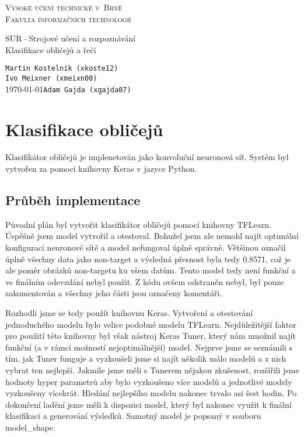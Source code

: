 \documentclass[a4paper,11pt]{article}
\begin{document}
	\begin{titlepage}
		\begin{center}
			\textsc{\Huge Vysoké učení technické v~Brně\\
				\vspace{0.4em}\huge Fakulta informačních technologií}
			
			
			{\LARGE SUR\,--\,Strojové učení a rozpoznávání\\
				\Huge Klasifikace obličejů a řeči\\ \vspace{0.3em}}
			
			
			{\Large \hfill \texttt{Martin Kostelník (xkoste12)}}\\
			{\Large \hfill \texttt{Ivo Meixner (xmeixn00)}}\\
			{\Large \today \hfill \texttt{Adam Gajda (xgajda07)}}
		\end{center}
	\end{titlepage}

	\section{Klasifikace obličejů}

		Klasifikátor obličejů je implenetován jako konvoluční neuronová síť. Systém byl vytvořen za pomoci knihovny Keras v jazyce Python.

		\subsection {Průběh implementace}
			Původní plán byl vytvořit klasifikátor obličejů pomocí knihovny TFLearn. Úspěšně jsem model vytvořil a otestoval. Bohužel jsem ale nemohl najít optimální konfiguraci neuronové sítě a model nefungoval úplně správně. Většinou označil úplně všechny data jako non-target a výsledná přesnost byla tedy 0.8571, což je ale poměr obrázků non-targetu ku všem datům. Tento model tedy není funkční a ve finálním odevzdání nebyl použit. Z kódu ovšem odstraněn nebyl, byl pouze zakomentován a všechny jeho části jsou označeny komentáři.
			
			\vspace{10pt}
			
			Rozhodli jsme se tedy použít knihovnu Keras. Vytvoření a otestování jednoduchého modelu bylo velice podobné modelu TFLearn. Nejdůležitější faktor pro použití této knihovny byl však nástroj Keras Tuner, který nám umožnil najít funkční (a v rámci možností nejoptimálnější) model. Nejprve jsme se seznámili s tím, jak Tuner funguje a vyzkoušeli jsme si najít několik málo modelů a z nich vybrat ten nejlepší. Jakmile jsme měli s Tunerem nějakou zkušenost, rozšířili jsme hodnoty hyper parametrů aby bylo vyzkoušeno více modelů a jednotlivé modely vyzkoušeny vícekrát. Hledání nejlepšího modelu nakonec trvalo asi šest hodin. Po dokončení ladění jsme měli k dispozici model, který byl nakonec využit k finální klasifikaci a generování výsledků. Samotný model je popsaný v souboru model\_shape.
			
\end{document}
